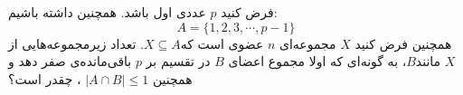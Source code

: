 \EXERCISE
فرض کنید
$p$
عددی اول باشد. همچنین داشته باشیم:
$$A = \{1, 2, 3, \cdots, p-1\}$$
همچنین فرض کنید
$X$
مجموعه‌ای
$n$
عضوی است که$X \subseteq A$. تعداد زیرمجموعه‌هایی از
$X$
مانند$B$، به گونه‌ای که اولا مجموع اعضای
$B$
در تقسیم بر
$p$
باقی‌مانده‌ی صفر دهد و همچنین
$|A \cap B| \leq 1$
، چقدر است؟